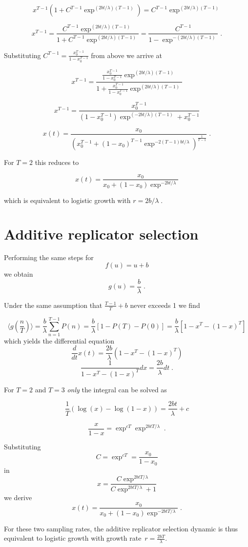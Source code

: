 $$x^{T-1}(1+C^{T-1}\exp^{(2bt/\lambda)(T-1)})=C^{T-1}\exp^{(2bt/\lambda)(T-1)}$$

$$x^{T-1}=\frac{C^{T-1}\exp^{(2bt/\lambda)(T-1)}}{1+C^{T-1}\exp^{(2bt/\lambda)(T-1)}}=\frac{C^{T-1}}{1-\exp^{-(2bt/\lambda)(T-1)}}\;.$$

Substituting $C^{T-1}=\frac{x_0^{T-1}}{1-x_0^{T-1}}$ from above we arrive at

$$x^{T-1}=\frac{\frac{x_0^{T-1}}{1-x_0^{T-1}}\exp^{(2bt/\lambda)(T-1)}}{1+\frac{x_0^{T-1}}{1-x_0^{T-1}}\exp^{(2bt/\lambda)(T-1)}}$$

$$x^{T-1}=\frac{x_0^{T-1}}{(1-x_0^{T-1})\exp^{(-2bt/\lambda)(T-1)}+x_0^{T-1}}$$




$$x(t)=\frac{x_0}{(x_0^{T-1}+(1-x_0)^{T-1}\exp^{-2(T-1)bt/\lambda})^\frac{1}{T-1}}\;.$$

For $T=2$ this reduces to

$$x(t)=\frac{x_0}{x_0+(1-x_0)\exp^{-2bt/\lambda}}$$

which is equivalent to logistic growth with $r=2b/\lambda\;.$

\section{Additive replicator selection}

Performing the same steps for
$$f(u)=u+b$$
we obtain
$$g(u) = \frac{b}{\lambda}\;.$$

Under the same assumption that $\frac{T-1}{T}+b$ never exceeds 1 we find

$$\langle g(\frac{n}{T})\rangle=\frac{b}{\lambda}\sum_{n=1}^{T-1} P(n)=\frac{b}{\lambda}[1-P(T)-P(0)]=\frac{b}{\lambda}[1-x^T-(1-x)^T]$$
which yields the differential equation
$$\frac{d}{dt}x(t)=\frac{2b}{\lambda}(1-x^T-(1-x)^T)$$
$$\frac{1}{1-x^T-(1-x)^T}dx=\frac{2b}{\lambda}dt\;.$$

For $T=2$ and $T=3$ \emph{only} the integral can be solved as

$$\frac{1}{T}(\log(x)-\log(1-x))=\frac{2bt}{\lambda}+c$$

$$\frac{x}{1-x}=\exp^{cT}\exp^{2btT/\lambda}\;.$$

Substituting
$$C=\exp^{cT}=\frac{x_0}{1-x_0}$$
in
$$x=\frac{C\exp^{2btT/\lambda}}{C\exp^{2btT/\lambda}+1}$$
we derive
$$x(t)=\frac{x_0}{x_0+(1-x_0)\exp^{-2btT/\lambda}}\;.$$

For these two sampling rates, the additive replicator selection dynamic is thus equivalent to logistic growth with growth rate~$r=\frac{2bT}{\lambda}$.
